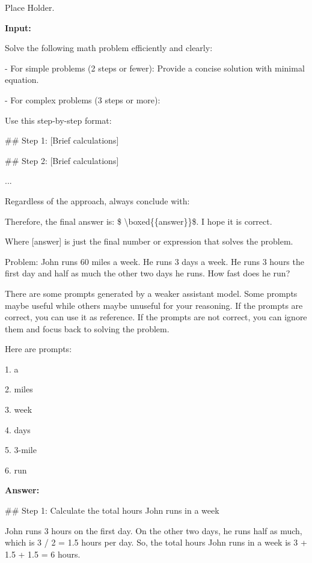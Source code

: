 \newpage

{\color{white} Place Holder.}

\newpage

\begin{tcolorbox}[
  colback=white, colframe=black, arc=3mm, width=2\columnwidth,
  title=\textbf{Example Input-Output for Zero-Shot Assist-CoT (GSM8K)},
  coltitle=white, colbacktitle=gray, fonttitle=\bfseries
]
{\bf Input:}

Solve the following math problem efficiently and clearly:

- For simple problems (2 steps or fewer): Provide a concise solution with minimal equation.

- For complex problems (3 steps or more):

Use this step-by-step format:

\#\# Step 1: [Brief calculations]

\#\# Step 2: [Brief calculations]

...

Regardless of the approach, always conclude with:

Therefore, the final answer is: \$ \textbackslash boxed\{\{answer\}\}\$. I hope it is correct.

Where [answer] is just the final number or expression that solves the problem.

Problem: John runs 60 miles a week. He runs 3 days a week.  He runs 3 hours the first day and half as much the other two days he runs.  How fast does he run?

There are some prompts generated by a weaker assistant model. Some prompts maybe useful while others maybe unuseful for your reasoning. If the prompts are correct, you can use it as reference. If the prompts are not correct, you can ignore them and focus back to solving the problem.

Here are prompts:

1. a

2. miles

3. week

4. days

5. 3-mile

6. run

\vspace{5pt}
\textbf{Answer:}

\#\# Step 1: Calculate the total hours John runs in a week

John runs 3 hours on the first day. On the other two days, he runs half as much, which is 3 / 2 = 1.5 hours per day. So, the total hours John runs in a week is 3 + 1.5 + 1.5 = 6 hours.


\end{tcolorbox}
